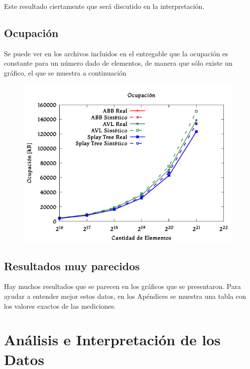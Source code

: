 \documentclass[12pt,letterpaper]{report}
\begin{document}
Este resultado ciertamente que será discutido en la interpretación.

\subsection{Ocupación}
\label{subsec:res_ocupacion}

Se puede ver en los archivos incluidos en el entregable que la ocupación es constante para un número dado de elementos, de manera que sólo existe un gráfico, el que se muestra a continuación

\begin{figure}[H]
\begin{center}
\includegraphics[scale=0.65]{ocupacion.png}
\end{center}
\end{figure}

\subsection{Resultados muy parecidos}
\label{subsec:res_parecidos}

Hay muchos resultados que se parecen en los gráficos que se presentaron. Para ayudar a entender mejor estos datos, en los Apéndices se muestra una tabla con los valores exactos de las mediciones.

\newpage
\section{Análisis e Interpretación de los Datos}
\end{document}
